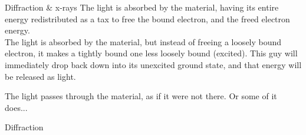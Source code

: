 \begin{frame}{Diffraction \& x-rays}
The light is absorbed by the material, having its entire energy redistributed as a tax to free the bound electron, and the freed electron energy.\\

The light is absorbed by the material, but instead of freeing a loosely bound electron, it makes a tightly bound one less loosely bound (excited). This guy will immediately drop back down into its unexcited ground state, and that energy will be released as light. 

The light passes through the material, as if it were not there. Or some of it does...



\end{frame}{Diffraction}


\begin{frame}
\small



\end{frame}




